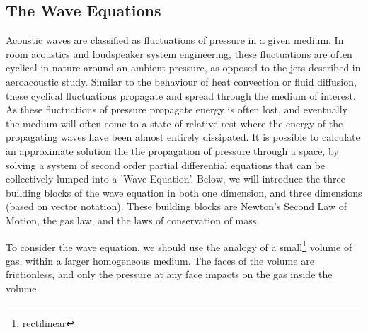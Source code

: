 \subsection{The Wave Equations}
Acoustic waves are classified as fluctuations of pressure in a given medium. In room acoustics and loudspeaker system engineering, these fluctuations are often cyclical in nature around an ambient pressure, as opposed to the jets described in aeroacoustic study. Similar to the behaviour of heat convection or fluid diffusion, these cyclical fluctuations propagate and spread through the medium of interest. As these fluctuations of pressure propagate energy is often lost, and eventually the medium will often come to a state of relative rest where the energy of the propagating waves have been almost entirely dissipated. It is possible to calculate an approximate solution the the propagation of pressure through a space, by solving a system of second order partial differential equations that can be collectively lumped into a 'Wave Equation'. Below, we will introduce the three building blocks of the wave equation in both one dimension, and three dimensions (based on vector notation). These building blocks are Newton's Second Law of Motion, the gas law, and the laws of conservation of mass.

To consider the wave equation, we should use the analogy of a small\footnote{rectilinear} volume of gas, within a larger homogeneous medium. The faces of the volume are frictionless, and only the pressure at any face impacts on the gas inside the volume.

